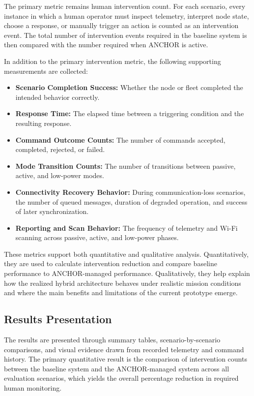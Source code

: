 \documentclass[journal]{IEEEtran}
\begin{document}
The primary metric remains human intervention count. For each scenario, every instance in which a human operator must inspect telemetry, interpret node state, choose a response, or manually trigger an action is counted as an intervention event. The total number of intervention events required in the baseline system is then compared with the number required when ANCHOR is active.

In addition to the primary intervention metric, the following supporting measurements are collected:

\begin{itemize}
    \item \textbf{Scenario Completion Success:} Whether the node or fleet completed the intended behavior correctly.
    \item \textbf{Response Time:} The elapsed time between a triggering condition and the resulting response.
    \item \textbf{Command Outcome Counts:} The number of commands accepted, completed, rejected, or failed.
    \item \textbf{Mode Transition Counts:} The number of transitions between passive, active, and low-power modes.
    \item \textbf{Connectivity Recovery Behavior:} During communication-loss scenarios, the number of queued messages, duration of degraded operation, and success of later synchronization.
    \item \textbf{Reporting and Scan Behavior:} The frequency of telemetry and Wi-Fi scanning across passive, active, and low-power phases.
\end{itemize}

These metrics support both quantitative and qualitative analysis. Quantitatively, they are used to calculate intervention reduction and compare baseline performance to ANCHOR-managed performance. Qualitatively, they help explain how the realized hybrid architecture behaves under realistic mission conditions and where the main benefits and limitations of the current prototype emerge.

\subsection{Results Presentation}
The results are presented through summary tables, scenario-by-scenario comparisons, and visual evidence drawn from recorded telemetry and command history. The primary quantitative result is the comparison of intervention counts between the baseline system and the ANCHOR-managed system across all evaluation scenarios, which yields the overall percentage reduction in required human monitoring.
\end{document}

